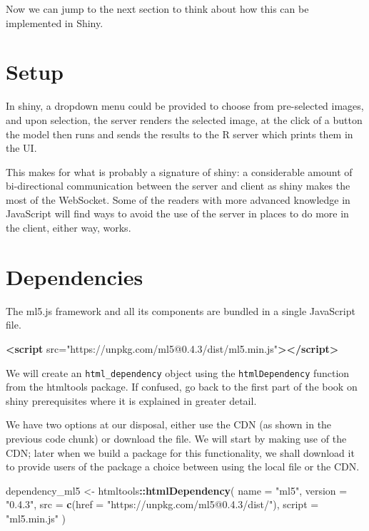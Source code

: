 \documentclass[10pt,]{krantz}
\makeatletter
\newenvironment{Shaded}{\begin{snugshade}}{\end{snugshade}}
\newcommand{\DataTypeTok}[1]{\textcolor[rgb]{0.27,0.27,0.27}{#1}}
\newcommand{\KeywordTok}[1]{\textcolor[rgb]{0.27,0.27,0.27}{\textbf{#1}}}
\newcommand{\NormalTok}[1]{#1}
\newcommand{\OperatorTok}[1]{\textcolor[rgb]{0.43,0.43,0.43}{\textbf{#1}}}
\newcommand{\OtherTok}[1]{\textcolor[rgb]{0.37,0.37,0.37}{#1}}
\newcommand{\StringTok}[1]{\textcolor[rgb]{0.5,0.5,0.5}{#1}}
\newenvironment{kframe}{%
\medskip{}
\setlength{\fboxsep}{.8em}
 \def\at@end@of@kframe{}%
 \ifinner\ifhmode%
  \def\at@end@of@kframe{\end{minipage}}%
  \begin{minipage}{\columnwidth}%
 \fi\fi%
 \def\FrameCommand##1{\hskip\@totalleftmargin \hskip-\fboxsep
 \colorbox{shadecolor}{##1}\hskip-\fboxsep
     \hskip-\linewidth \hskip-\@totalleftmargin \hskip\columnwidth}%
 \MakeFramed {\advance\hsize-\width
   \@totalleftmargin\z@ \linewidth\hsize
   \@setminipage}}%
 {\par\unskip\endMakeFramed%
 \at@end@of@kframe}
\renewenvironment{Shaded}{\begin{kframe}}{\end{kframe}}
\makeatother
\begin{document}
Now we can jump to the next section to think about how this can be implemented in Shiny.

\hypertarget{shiny-complete-setup}{%
\section{Setup}\label{shiny-complete-setup}}

In shiny, a dropdown menu could be provided to choose from pre-selected images, and upon selection, the server renders the selected image, at the click of a button the model then runs and sends the results to the R server which prints them in the UI.

This makes for what is probably a signature of shiny: a considerable amount of bi-directional communication between the server and client as shiny makes the most of the WebSocket. Some of the readers with more advanced knowledge in JavaScript will find ways to avoid the use of the server in places to do more in the client, either way, works.

\hypertarget{shiny-complete-dependencies}{%
\section{Dependencies}\label{shiny-complete-dependencies}}

The ml5.js framework and all its components are bundled in a single JavaScript file.

\begin{Shaded}
\begin{Highlighting}[]
\KeywordTok{<script}\OtherTok{ src=}\StringTok{"https://unpkg.com/ml5@0.4.3/dist/ml5.min.js"}\KeywordTok{></script>}
\end{Highlighting}
\end{Shaded}

We will create an \texttt{html\_dependency} object using the \texttt{htmlDependency} function from the htmltools package. If confused, go back to the first part of the book on shiny prerequisites where it is explained in greater detail.

We have two options at our disposal, either use the CDN (as shown in the previous code chunk) or download the file. We will start by making use of the CDN; later when we build a package for this functionality, we shall download it to provide users of the package a choice between using the local file or the CDN.

\begin{Shaded}
\begin{Highlighting}[]
\NormalTok{dependency_ml5 <-}\StringTok{ }\NormalTok{htmltools}\OperatorTok{::}\KeywordTok{htmlDependency}\NormalTok{(}
  \DataTypeTok{name =} \StringTok{"ml5"}\NormalTok{,}
  \DataTypeTok{version =} \StringTok{"0.4.3"}\NormalTok{,}
  \DataTypeTok{src =} \KeywordTok{c}\NormalTok{(}\DataTypeTok{href =} \StringTok{"https://unpkg.com/ml5@0.4.3/dist/"}\NormalTok{),}
  \DataTypeTok{script =} \StringTok{"ml5.min.js"}
\NormalTok{)}
\end{Highlighting}
\end{Shaded}
\end{document}
